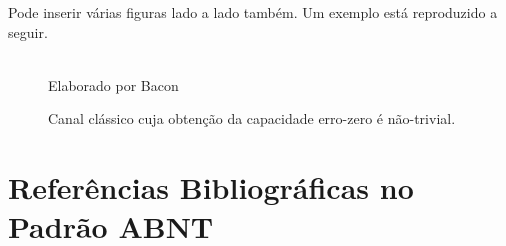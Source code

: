 Pode inserir várias figuras lado a lado também. Um exemplo está reproduzido a seguir.

\begin{figure}[H]
  \centering
  \caption{Canal clássico cuja obtenção da capacidade erro-zero é não-trivial.}
  \hspace{0.5cm}
  \hspace{0.5cm}
  \\
  \small{Elaborado por Bacon}
\end{figure}





\section{Referências Bibliográficas no Padrão ABNT}
